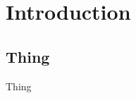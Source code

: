 \documentclass[12pt]{report}
\begin{document}
	\tableofcontents
	\listoffigures
	\listoftables
	
	
	\chapter{Introduction}
	\label{ch:introduction}
	
	
	
	\clearpage
	\renewcommand{\bibname}{References}
	\printbibliography
	
	
	\begin{appendices}
		\chapter{Thing}
		\label{app:appendix}
		Thing
		
	\end{appendices}
	
\end{document}
